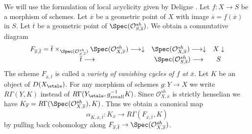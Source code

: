 \medskip\noindent
We will use the formulation of local acyclicity given by
Deligne \cite[Definition 2.12, page 242]{SGA4.5}.
Let $f : X \to S$ be a morphism of schemes.
Let $\overline{x}$ be a geometric point of $X$ with image
$\overline{s} = f(\overline{x})$ in $S$.
Let $\overline{t}$ be a geometric point of
$\Spec(\mathcal{O}^{sh}_{S, \overline{s}})$.
We obtain a commutative diagram
$$
\begin{array}{ccc}F_{\overline{x}, \overline{t}} =
\overline{t} \times_{\Spec(\mathcal{O}^{sh}_{S, \overline{s}})}
\Spec(\mathcal{O}^{sh}_{X, \overline{x}}) \longrightarrow\downarrow & \Spec(\mathcal{O}^{sh}_{X, \overline{x}}) \longrightarrow\downarrow & X \downarrow \\ \overline{t} \longrightarrow & \Spec(\mathcal{O}^{sh}_{S, \overline{s}}) \longrightarrow & S\end{array}
$$
The scheme $F_{\overline{x}, \overline{t}}$ is called
a {\it variety of vanishing cycles of $f$ at $\overline{x}$}.
Let $K$ be an object of $D(X_\etale)$. For any morphism of schemes
$g : Y\to X$ we write $R\Gamma(Y, K)$ instead of
$R\Gamma(Y_\etale, g_{small}^{-1}K)$. Since
$\mathcal{O}^{sh}_{X, \overline{x}}$ is strictly henselian
we have
$K_{\overline{x}} = R\Gamma(\Spec(\mathcal{O}^{sh}_{X, \overline{x}}), K)$.
Thus we obtain a canonical map
\begin{equation}
\label{equation-alpha-K}
\alpha_{K, \overline{x}, \overline{t}} :
K_{\overline{x}}
\longrightarrow
R\Gamma(F_{\overline{x}, \overline{t}}, K)
\end{equation}
by pulling back cohomology along
$F_{\overline{x}, \overline{t}} \to \Spec(\mathcal{O}^{sh}_{X, \overline{x}})$.

